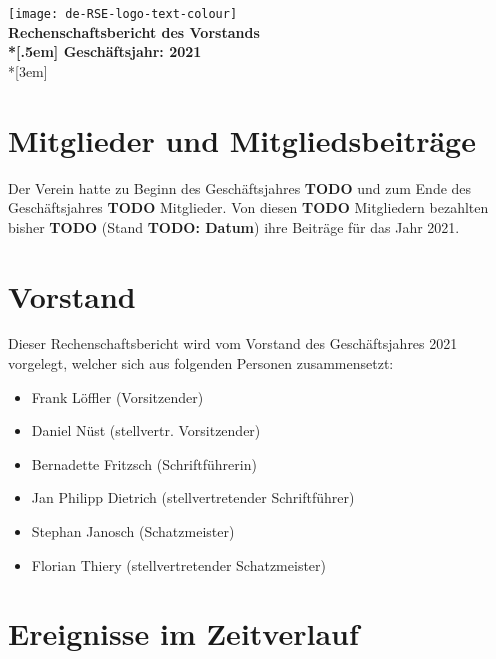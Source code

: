 \newcommand{\jahr}{2021}



\thispagestyle{empty}

\begin{centering}
\texttt{[image: de-RSE-logo-text-colour]}\\
\vspace{3em}
\textbf{
 \Large Rechenschaftsbericht des Vorstands\\*[.5em]
 \normalsize Geschäftsjahr: \jahr}\\*[3em]
\end{centering}

\section{Mitglieder und Mitgliedsbeiträge}

Der Verein hatte zu Beginn des Geschäftsjahres \textbf{TODO} und zum Ende des Geschäftsjahres \textbf{TODO} Mitglieder. Von diesen  \textbf{TODO} Mitgliedern bezahlten bisher  \textbf{TODO} (Stand \textbf{TODO: Datum}) ihre Beiträge für das Jahr 2021.

\section{Vorstand}

Dieser Rechenschaftsbericht wird vom Vorstand des Geschäftsjahres 2021 vorgelegt, welcher sich aus folgenden Personen zusammensetzt:

\begin{itemize}
  \setlength{\itemsep}{0pt plus 1pt}
  \item Frank Löffler (Vorsitzender)
  \item Daniel Nüst (stellvertr. Vorsitzender)
  \item Bernadette Fritzsch (Schriftführerin)
  \item Jan Philipp Dietrich (stellvertretender Schriftführer)
  \item Stephan Janosch (Schatzmeister)
  \item Florian Thiery (stellvertretender Schatzmeister)
\end{itemize}

\section{Ereignisse im Zeitverlauf}

